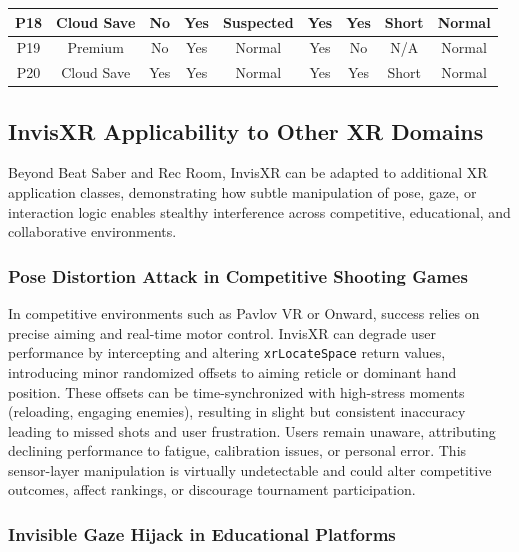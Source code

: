 \documentclass[letterpaper,twocolumn,10pt]{article}
\begin{document}
\begin{table}[h]
{\begin{tabular}{|c|cccc|cccc|}
P18 & \multicolumn{1}{c|}{Cloud Save} & \multicolumn{1}{c|}{No} & \multicolumn{1}{c|}{Yes} & Suspected & \multicolumn{1}{c|}{Yes} & \multicolumn{1}{c|}{Yes} & \multicolumn{1}{c|}{Short} & Normal \\ \hline
P19 & \multicolumn{1}{c|}{Premium} & \multicolumn{1}{c|}{No} & \multicolumn{1}{c|}{Yes} & Normal & \multicolumn{1}{c|}{Yes} & \multicolumn{1}{c|}{No} & \multicolumn{1}{c|}{N/A} & Normal \\ \hline
P20 & \multicolumn{1}{c|}{Cloud Save} & \multicolumn{1}{c|}{Yes} & \multicolumn{1}{c|}{Yes} & Normal & \multicolumn{1}{c|}{Yes} & \multicolumn{1}{c|}{Yes} & \multicolumn{1}{c|}{Short} & Normal \\ \hline
\end{tabular}%
}
\end{table}

\subsection{InvisXR Applicability to Other XR Domains}
\label{sec:invisxr_other_apps}

Beyond Beat Saber and Rec Room, InvisXR can be adapted to additional XR application classes, demonstrating how subtle manipulation of pose, gaze, or interaction logic enables stealthy interference across competitive, educational, and collaborative environments.

\subsubsection{Pose Distortion Attack in Competitive Shooting Games}

In competitive environments such as Pavlov VR or Onward, success relies on precise aiming and real-time motor control. InvisXR can degrade user performance by intercepting and altering \texttt{xrLocateSpace} return values, introducing minor randomized offsets to aiming reticle or dominant hand position. These offsets can be time-synchronized with high-stress moments (reloading, engaging enemies), resulting in slight but consistent inaccuracy leading to missed shots and user frustration. Users remain unaware, attributing declining performance to fatigue, calibration issues, or personal error. This sensor-layer manipulation is virtually undetectable and could alter competitive outcomes, affect rankings, or discourage tournament participation.

\subsubsection{Invisible Gaze Hijack in Educational Platforms}
\end{document}
